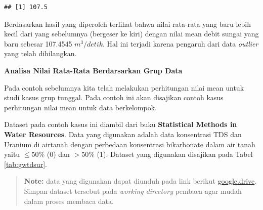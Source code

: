 \documentclass[]{book}
\newenvironment{Shaded}{\begin{snugshade}}{\end{snugshade}}
\newcommand{\KeywordTok}[1]{\textcolor[rgb]{0.13,0.29,0.53}{\textbf{#1}}}
\newcommand{\DataTypeTok}[1]{\textcolor[rgb]{0.13,0.29,0.53}{#1}}
\newcommand{\StringTok}[1]{\textcolor[rgb]{0.31,0.60,0.02}{#1}}
\newcommand{\CommentTok}[1]{\textcolor[rgb]{0.56,0.35,0.01}{\textit{#1}}}
\newcommand{\OperatorTok}[1]{\textcolor[rgb]{0.81,0.36,0.00}{\textbf{#1}}}
\newcommand{\NormalTok}[1]{#1}
\begin{document}
\begin{verbatim}
## [1] 107.5
\end{verbatim}

Berdasarkan hasil yang diperoleh terlihat bahwa nilai rata-rata yang
baru lebih kecil dari yang sebelumnya (bergeser ke kiri) dengan nilai
mean debit sungai yang baru sebesar 107.4545 \(m^3/detik\). Hal ini
terjadi karena pengaruh dari data \emph{outlier} yang telah dihilangkan.

\textbf{Analisa Nilai Rata-Rata Berdarsarkan Grup Data}

Pada contoh sebelumnya kita telah melakukan perhitungan nilai mean untuk
studi kasus grup tunggal. Pada contoh ini akan disajikan contoh kasus
perhitungan nilai mean untuk data berkelompok.

Dataset pada contoh kasus ini diambil dari buku \textbf{Statistical
Methods in Water Resources}. Data yang digunakan adalah data konsentrasi
TDS dan Uranium di airtanah dengan perbedaan konsentrasi bikarbonate
dalam air tanah yaitu \(\leq 50\)\% (0) dan \(>50\)\% (1). Dataset yang
digunakan disajikan pada Tabel \ref{tab:gwtdsur}.

\begin{quote}
\textbf{Note: } data yang digunakan dapat diunduh pada link berikut
\href{https://drive.google.com/open?id=1-k_1Fkl2hWmI9ZohG9hWGrqKe4o8GArW}{google.drive}.
Simpan dataset tersebut pada \emph{working directory} pembaca agar mudah
dalam proses membaca data.
\end{quote}

\begin{Shaded}
\end{Shaded}
\end{document}
